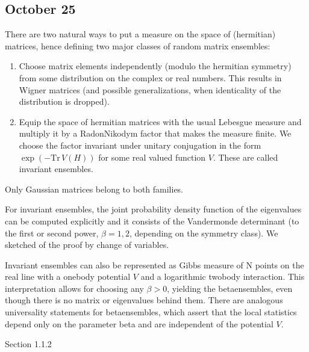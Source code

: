 \documentclass[letterpaper,10pt,english]{sphinxhowto}
\begin{document}
\subsection{October 25}
\label{\detokenize{teaching/random_matrices_2017:october-25}}
\sphinxAtStartPar
There are two natural ways to put a measure on the space of (hermitian) matrices, hence defining two major classes of random matrix ensembles:
\begin{enumerate}
%
\item {} 
\sphinxAtStartPar
Choose matrix elements independently (modulo the hermitian symmetry) from some distribution on the complex or real numbers. This results in Wigner matrices (and possible generalizations, when identicality of the distribution is dropped).

\item {} 
\sphinxAtStartPar
Equip the space of hermitian matrices with the usual Lebesgue measure and multiply it by a Radon\sphinxhyphen{}Nikodym factor that makes the measure finite. We choose the factor invariant under unitary conjugation in the form \(\exp(-\text{Tr}\, V(H))\) for some real valued function \(V\). These are called invariant ensembles.

\end{enumerate}

\sphinxAtStartPar
Only Gaussian matrices belong to both families.

\sphinxAtStartPar
For invariant ensembles, the joint probability density function of the eigenvalues can be computed explicitly and it consists of the Vandermonde determinant (to the first or second power, \(\beta=1,2\), depending on the symmetry class). We sketched of the proof by change of variables.

\sphinxAtStartPar
Invariant ensembles can also be represented as Gibbs measure of N points on the real line with a one\sphinxhyphen{}body potential \(V\) and a logarithmic two\sphinxhyphen{}body interaction. This interpretation allows for choosing any \(\beta>0\), yielding the beta\sphinxhyphen{}ensembles, even though there is no matrix or eigenvalues behind them. There are analogous universality statements for beta\sphinxhyphen{}ensembles, which assert that the local statistics depend only on the parameter beta and are independent of the potential \(V\).

\sphinxAtStartPar
{}  Section 1.1.2
\end{document}

